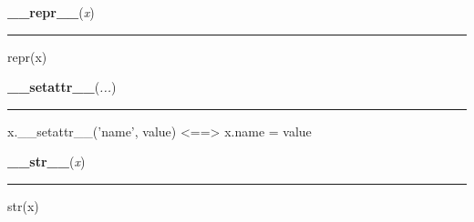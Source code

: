     \label{object:__repr__}

    \vspace{0.5ex}

    \begin{boxedminipage}{\textwidth}

    \raggedright \textbf{\_\_repr\_\_}(\textit{x})

    \vspace{-1.5ex}

    \rule{\textwidth}{0.5\fboxrule}
    repr(x)

    \vspace{1ex}

    \end{boxedminipage}

    \label{object:__setattr__}

    \vspace{0.5ex}

    \begin{boxedminipage}{\textwidth}

    \raggedright \textbf{\_\_setattr\_\_}(\textit{...})

    \vspace{-1.5ex}

    \rule{\textwidth}{0.5\fboxrule}
    x.\_\_setattr\_\_('name', value) {\textless}=={\textgreater} x.name = 
    value

    \vspace{1ex}

    \end{boxedminipage}

    \label{object:__str__}

    \vspace{0.5ex}

    \begin{boxedminipage}{\textwidth}

    \raggedright \textbf{\_\_str\_\_}(\textit{x})

    \vspace{-1.5ex}

    \rule{\textwidth}{0.5\fboxrule}
    str(x)

    \vspace{1ex}

    \end{boxedminipage}



